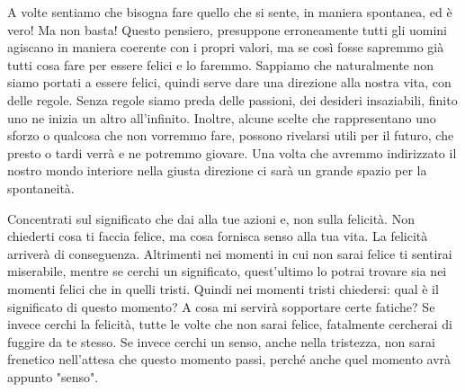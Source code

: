 \documentclass[12pt]{book} %
\begin{document}
A volte sentiamo che bisogna fare quello che si sente, in maniera spontanea, ed è vero! Ma non basta! Questo pensiero,
presuppone erroneamente tutti gli uomini agiscano in maniera coerente con i propri valori, ma se così fosse sapremmo
già tutti cosa fare per essere felici e lo faremmo. Sappiamo che naturalmente non siamo portati a essere felici, quindi
serve dare una direzione alla nostra vita, con delle regole. Senza regole siamo preda delle passioni, dei desideri
insaziabili, finito uno ne inizia un altro all'infinito. Inoltre, alcune scelte che rappresentano
uno sforzo o qualcosa che non vorremmo fare, possono rivelarsi utili per il futuro, che presto o tardi verrà e ne
potremmo giovare. Una volta che avremmo indirizzato il nostro mondo interiore nella giusta direzione ci sarà un grande
spazio per la spontaneità.

Concentrati sul significato che dai alla tue azioni e, non sulla felicità. Non chiederti cosa ti faccia felice, ma cosa
fornisca senso alla tua vita. La felicità arriverà di conseguenza.
Altrimenti nei momenti in cui non sarai felice ti sentirai miserabile, mentre se cerchi un significato, quest'ultimo lo potrai trovare sia nei momenti felici che in quelli tristi. Quindi nei momenti tristi chiedersi: qual è il significato di questo momento? A cosa mi servirà sopportare certe fatiche?
Se invece cerchi la felicità, tutte le volte che non sarai felice, fatalmente cercherai di fuggire da te stesso.
Se invece cerchi un senso, anche nella tristezza, non sarai frenetico nell'attesa che questo momento passi, perché anche quel momento avrà appunto "senso".
\end{document}

